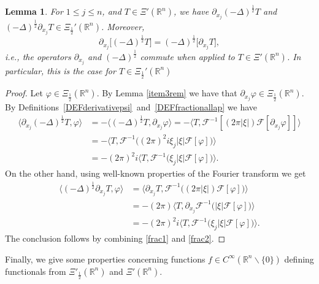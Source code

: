 \documentclass[reqno,11pt]{amsart}
\newtheorem{lemma}[theorem]{Lemma}
\theoremstyle{definition}
\def\R{\mathbb{R}}
\begin{document}
\begin{lemma}\label{LEMcommutativity}
	For $1\leq j\leq n$, and $T\in \Xi'(\R^n)$,  we have $ \partial_{x_j} (-\Delta)^{\frac{1}{2}}T$ and $(-\Delta)^{\frac{1}{2}}\partial_{x_j}T\in \Xi_\frac{1}{2}'(\R^n)$. Moreover,
	\begin{equation*}
		\partial_{x_j} \big[(-\Delta)^{\frac{1}{2}} T\big]=(-\Delta)^{\frac{1}{2}} \big[ \partial_{x_j}T\big],
	\end{equation*}
	i.e., the operators $\partial_{x_j}$ and $ (-\Delta)^{\frac{1}{2}}$ commute when applied to $T\in \Xi'(\R^n)$. In particular, this is the case for $T\in \Xi_\frac{1}{2}'(\R^n)$
\end{lemma}
\begin{proof}
Let $\varphi\in \Xi_\frac{1}{2}(\R^n)$. By Lemma \ref{item3rem} we have that $ \partial_{x_j} \varphi \in \Xi_\frac{1}{2}(\mathbb{R}^n)$. By Definitions~\ref{DEFderivativepsi}~and~\ref{DEFfractionallap} we have
	\begin{align}
		\nonumber
		\big\langle \partial_{x_j}(-\Delta)^{\frac{1}{2}} T, \varphi \big\rangle &=
- \big\langle (-\Delta)^{\frac{1}{2}} T, \partial_{x_j}\varphi \big\rangle
=- \langle T,\mathcal{F}^{-1}[( 2\pi | \xi| )\mathcal{F} [\partial_{x_j} \varphi ]]\rangle\\
\nonumber
		&=- \big\langle T,  \mathcal{F}^{-1}\big((2\pi)^{2} i\xi_j | \xi| \mathcal{F} [\varphi] \big)\big\rangle
				\label{frac1}
\\
&=-(2\pi)^{2} i \big\langle T,  \mathcal{F}^{-1}\big(\xi_j | \xi| \mathcal{F} [\varphi] \big)\big\rangle.
	\end{align}
	On the other hand, using well-known properties of the Fourier transform we get
	\begin{align}
		\nonumber
		\big\langle (-\Delta)^{\frac{1}{2}} \partial_{x_j}T, \varphi \big\rangle &= \big\langle  \partial_{x_j}T, \mathcal{F}^{-1} \big(( 2\pi | \xi| )\mathcal{F} [\varphi ] \big)\big\rangle\\
		\label{frac2}
		&=-(2 \pi )\big\langle T,\partial_{x_j} \mathcal{F}^{-1} \big(| \xi|\mathcal{F} [\varphi ] \big)\big\rangle \nonumber\\
		& = -(2 \pi )^{2} i\big\langle T, \mathcal{F}^{-1} \big(\xi_j| \xi| \mathcal{F} [\varphi ] \big) \big\rangle.
	\end{align}
	The conclusion follows by combining \eqref{frac1} and \eqref{frac2}.	
\end{proof}

Finally, we give some properties concerning functions $f\in C^\infty(\R^n\backslash\{0\})$ defining functionals from $\Xi'_{\frac{1}{2}}(\R^n)$ and $\Xi'(\R^n)$.
\end{document}
